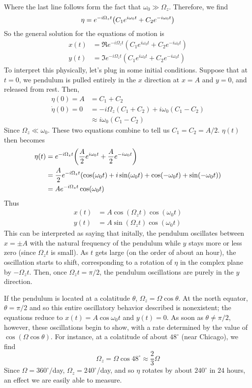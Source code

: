 Where the last line follows form the fact that $\omega_0\gg \Omega_z$. Therefore, we find 
\[ \eta = e^{-i\Omega_z t}\pqty{C_1e^{i\omega_0t} + C_2e^{-i\omega_0t}} \]
So the general solution for the equations of motion is 
\begin{align*}
    x(t) &= \Re e^{-i\Omega_z t}(C_1e^{i\omega_0t}+C_2e^{-i\omega_0t}) \\
    y(t) &= \Im e^{-i\Omega_z t}(C_1e^{i\omega_0t}+C_2e^{-i\omega_0t}) 
\end{align*}
To interpret this physically, let's plug in some initial conditions. Suppose that at $t=0$, we pendulum is pulled entirely in the $x$ direction at $x=A$ and $y=0$, and released from rest. Then,\begin{align*}
    \eta(0) = A &= C_1+C_2 \\
    \dot\eta(0) = 0 &= -i\Omega_z(C_1+C_2) + i\omega_0(C_1-C_2) \\
    &\approx i\omega_0(C_1-C_2)
\end{align*}
Since $\Omega_z\ll\omega_0$. These two equations combine to tell us $C_1=C_2=A/2$. $\eta(t)$ then becomes
\begin{align*}
    \eta (t) &= e^{-i\Omega_z t}\pqty{\frac{A}{2}e^{i\omega_0 t}+\frac{A}{2}e^{-i\omega_0t }} \\
    &= \frac{A}{2}e^{-i\Omega_z t}\pqty{\cos(\omega_0t) + i\sin(\omega_0t) + \cos(-\omega_0t)+\sin(-\omega_0t)} \\
    &= Ae^{-i\Omega_z t}\cos(\omega_0 t)
\end{align*}
Thus
\begin{align*}
    x(t) &= A\cos(\Omega_z t)\cos(\omega_0t) \\
    y(t) &= A\sin(\Omega_z t)\cos(\omega_0 t) 
\end{align*}
This can be interpreted as saying that initally, the pendulum oscillates between $x = \pm A$ with the natural frequency of the pendulum while $y$ stays more or less zero (since $\Omega_z t$ is small). As $t$ gets large (on the order of about an hour), the oscillation starts to shift, corresponding to a rotation of $\eta$ in the complex plane by $-\Omega_z t$. Then, once $\Omega_z t = \pi/2$, the pendulum oscillations are purely in the $y$ direction.

If the pendulum is located at a colatitude $\theta$, $\Omega_z = \Omega\cos\theta$. At the north equator, $\theta=\pi/2$ and so this entire oscillatory behavior described is nonexistent; the equations reduce to $x(t) = A\cos\omega _0t$ and $y(t) = 0$. As soon as $\theta\neq\pi/2$, however, these oscillations begin to show, with a rate determined by the value of $\cos(\Omega\cos\theta)$. For instance, at a colatitude of about $48^\circ$ (near Chicago), we find 
\[ \Omega_z = \Omega\cos 48^\circ \approx \frac{2}{3}\Omega \]
Since $\Omega = 360^\circ/$day, $\Omega_z = 240^\circ$/day, and so $\eta$ rotates by about $240^\circ$ in $24$ hours, an effect we are easily able to measure.